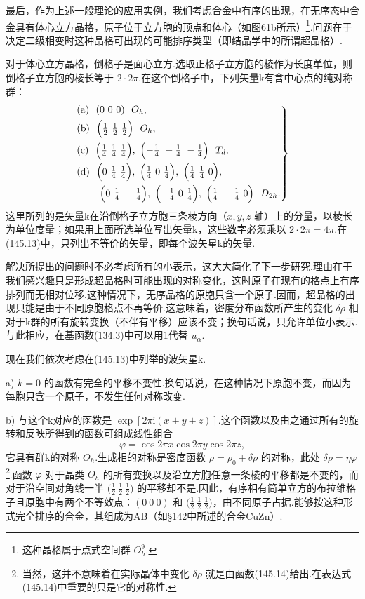 最后，作为上述一般理论的应用实例，我们考虑合金中有序的出现，在无序态中合金具有体心立方晶格，原子位于立方胞的顶点和体心（如图61b所示）\footnote{这种晶格属于点式空间群 $O_h^9$.}.问题在于决定二级相变时这种晶格可出现的可能排序类型（即结晶学中的所谓超晶格）.

对于体心立方晶格，倒格子是面心立方.选取正格子立方胞的棱作为长度单位，则倒格子立方胞的棱长等于 $2\cdot2\pi$.在这个倒格子中，下列矢量k有含中心点的纯对称群：
\begin{equation}
\left.\begin{aligned}
  &\text{(a)}\ \ (0\ 0\ 0)\ \ O_h,\\
  &\text{(b)}\ \ \Bigl(\tfrac{1}{2}\ \tfrac{1}{2}\ \tfrac{1}{2}\Bigr)\ \ O_h,\\
  &\text{(c)}\ \ \Bigl(\tfrac{1}{4}\ \tfrac{1}{4}\ \tfrac{1}{4}\Bigr),\
  \Bigl(-\tfrac{1}{4}\ -\tfrac{1}{4}\ -\tfrac{1}{4}\Bigr)\ \ T_d,\\
  &\text{(d)}\ \ \Bigl(0\ \tfrac{1}{4}\ \tfrac{1}{4}\Bigr),\
  \Bigl(\tfrac{1}{4}\ 0\ \tfrac{1}{4}\Bigr),\
  \Bigl(\tfrac{1}{4}\ \tfrac{1}{4}\ 0\Bigr),\\
  &\qquad\ \Bigl(0\ \tfrac{1}{4}\ -\tfrac{1}{4}\Bigr),\
  \Bigl(-\tfrac{1}{4}\ 0\ \tfrac{1}{4}\Bigr),\
  \Bigl(\tfrac{1}{4}\ -\tfrac{1}{4}\ 0\Bigr)\ \ D_{2h}.
\end{aligned}\right\}
\end{equation}
这里所列的是矢量k在沿倒格子立方胞三条棱方向（$x,y,z$ 轴）上的分量，以棱长为单位度量；如果用上面所选单位写出矢量k，这些数字必须乘以 $2\cdot2\pi=4\pi$.在(145.13)中，只列出不等价的矢量，即每个波矢星k的矢量.

解决所提出的问题时不必考虑所有的小表示，这大大简化了下一步研究.理由在于我们感兴趣只是形成超晶格时可能出现的对称变化，这时原子在现有的格点上有序排列而无相对位移.这种情况下，无序晶格的原胞只含一个原子.因而，超晶格的出现只能是由于不同原胞格点不再等价.这意味着，密度分布函数所产生的变化 $\delta\rho$ 相对于k群的所有旋转变换（不伴有平移）应该不变；换句话说，只允许单位小表示.与此相应，在基函数(134.3)中可以用1代替 $u_\alpha$.

现在我们依次考虑在(145.13)中列举的波矢星k.

a) $k=0$ 的函数有完全的平移不变性.换句话说，在这种情况下原胞不变，而因为每胞只含一个原子，不发生任何对称改变.

b) 与这个k对应的函数是 $\exp[2\pi\mathrm{i}(x+y+z)]$.这个函数以及由之通过所有的旋转和反映所得到的函数可组成线性组合
\begin{equation}
  \varphi=\cos2\pi x\cos2\pi y\cos2\pi z,
\end{equation}
它具有群k的对称 $O_h$.生成相的对称是密度函数 $\rho=\rho_0+\delta\rho$ 的对称，此处 $\delta\rho=\eta\varphi$\footnote{当然，这并不意味着在实际晶体中变化 $\delta\rho$ 就是由函数(145.14)给出.在表达式(145.14)中重要的只是它的对称性.}.函数 $\varphi$ 对于晶类 $O_h$ 的所有变换以及沿立方胞任意一条棱的平移都是不变的，而对于沿空间对角线一半 $\bigl(\frac{1}{2}\ \frac{1}{2}\ \frac{1}{2}\bigr)$ 的平移却不是.因此，有序相有简单立方的布拉维格子且原胞中有两个不等效点：$(0\ 0\ 0)$ 和 $\bigl(\frac{1}{2}\ \frac{1}{2}\ \frac{1}{2}\bigr)$，由不同原子占据.能够按这种形式完全排序的合金，其组成为AB（如§142中所述的合金CuZn）.

